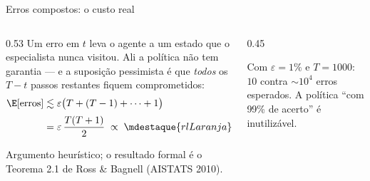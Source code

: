 \documentclass[aspectratio=169, 11pt]{beamer}
\begin{document}
\begin{frame}{Erros compostos: o custo real}

  \begin{columns}[T]
  \begin{column}{0.53\textwidth}
    Um erro em $t$ leva o agente a um estado que o especialista nunca visitou.
    Ali a política não tem garantia --- e a suposição pessimista é que
    \emph{todos} os $T-t$ passos restantes fiquem comprometidos:
    \begin{align*}
      \E[\text{erros}] &\lesssim
        \varepsilon\bigl(T + (T-1) + \dots + 1\bigr)\\[0.2em]
        &= \varepsilon\,\frac{T(T+1)}{2}
        \;\propto\; \mdestaque{rlLaranja}{\varepsilon\,T^{2}}
    \end{align*}

    \smallskip
    {\scriptsize\color{rlCinza} Argumento heurístico; o resultado formal é o
    Teorema 2.1 de Ross \& Bagnell (AISTATS 2010).}
  \end{column}
  \begin{column}{0.45\textwidth}
    \begin{center}
    \end{center}
    \begin{alertabox}
      Com $\varepsilon = 1\%$ e $T = 1000$: $10$ contra $\sim\!10^{4}$ erros
      esperados. A política ``com 99\% de acerto'' é inutilizável.
    \end{alertabox}
  \end{column}
  \end{columns}
\end{frame}
\end{document}
